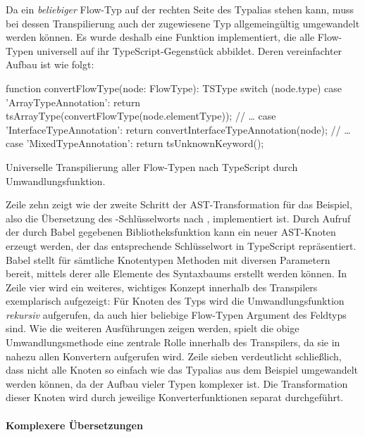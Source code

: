 Da ein \emph{beliebiger} Flow-Typ auf der rechten Seite des Typalias stehen kann, muss bei dessen Transpilierung auch der zugewiesene Typ allgemeingültig umgewandelt werden können. Es wurde deshalb eine Funktion implementiert, die alle Flow-Typen universell auf ihr TypeScript-Gegenstück abbildet. Deren vereinfachter Aufbau ist wie folgt:

\bigbreak
\begin{listing}[htb]
\begin{textcode}
function convertFlowType(node: FlowType): TSType {
  switch (node.type) {
    case 'ArrayTypeAnnotation':
      return tsArrayType(convertFlowType(node.elementType));
    // …
    case 'InterfaceTypeAnnotation':
      return convertInterfaceTypeAnnotation(node);
    // …
    case 'MixedTypeAnnotation':
      return tsUnknownKeyword();
  }
}
\end{textcode}
\listingvspace
\caption{Universelle Transpilierung aller Flow-Typen nach TypeScript durch Umwandlungsfunktion.}
\label{code:convert-flow-type}
\end{listing}

Zeile zehn zeigt wie der zweite Schritt der AST-Transformation für das Beispiel, also die Übersetzung des -Schlüsselworts nach , implementiert ist. Durch Aufruf der durch Babel gegebenen Bibliotheksfunktion  kann ein neuer AST-Knoten erzeugt werden, der das entsprechende Schlüsselwort in TypeScript repräsentiert. Babel stellt für sämtliche Knotentypen Methoden mit diversen Parametern bereit, mittels derer alle Elemente des Syntaxbaums erstellt werden können. In Zeile vier wird ein weiteres, wichtiges Konzept innerhalb des Transpilers exemplarisch aufgezeigt: Für Knoten des Typs  wird die Umwandlungsfunktion \emph{rekursiv} aufgerufen, da auch hier beliebige Flow-Typen Argument des Feldtyps sind. Wie die weiteren Ausführungen zeigen werden, spielt die obige Umwandlungsmethode eine zentrale Rolle innerhalb des Transpilers, da sie in nahezu allen Konvertern aufgerufen wird. Zeile sieben verdeutlicht schließlich, dass nicht alle Knoten so einfach wie das Typalias aus dem Beispiel umgewandelt werden können, da der Aufbau vieler Typen komplexer ist. Die Transformation dieser Knoten wird durch jeweilige Konverterfunktionen separat durchgeführt.

\paragraph{Komplexere Übersetzungen}

